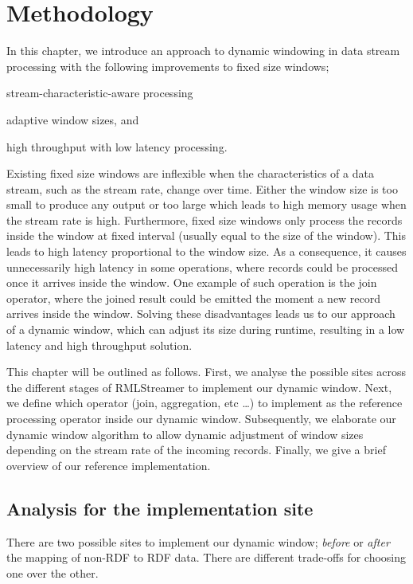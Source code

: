 \chapter{Methodology}%
\label{chap:Methodology}


In this chapter, we introduce an approach to dynamic windowing 
in data stream processing 
with the following improvements to fixed size windows; 
\begin{enumerate*}[label=(\alph*)]
    \item stream-characteristic-aware processing 
    \item adaptive window sizes, and 
    \item high throughput with low latency processing. 
\end{enumerate*}

Existing fixed size windows are inflexible when the characteristics of a data stream,  
such as the stream rate, change over time. Either the window size is 
too small to produce any output or too large which leads to high memory usage when 
the stream rate is high. Furthermore, fixed size windows only process the 
records inside the window at fixed interval (usually equal to the size of the window). 
This leads to high latency proportional to the window size. As a consequence, 
it causes unnecessarily high latency in some operations, where records could be processed once it arrives inside 
the window. One example of such operation is the join operator, where the joined 
result could be emitted the moment a new record arrives inside the window. 
Solving these disadvantages leads us to our approach 
of a dynamic window, which can adjust its size during runtime,
resulting in a low latency and high throughput solution. 


This chapter will be outlined as follows. 
First, we analyse the possible sites across the different stages of 
RMLStreamer to implement our dynamic window. Next, we define which operator
(join, aggregation, etc \dots) to implement as the reference processing operator inside 
our dynamic window. Subsequently, we elaborate our dynamic window algorithm to allow 
dynamic adjustment of window sizes depending on the stream rate of the incoming records.  
Finally, we give a brief overview of our reference implementation.



\section{Analysis for the implementation site}
\label{sec:analysis implementation site}
There are two possible sites to implement our dynamic window; 
\emph{before} or \emph{after} the mapping of non-RDF to RDF data. There are different trade-offs for choosing one 
over the other. 

